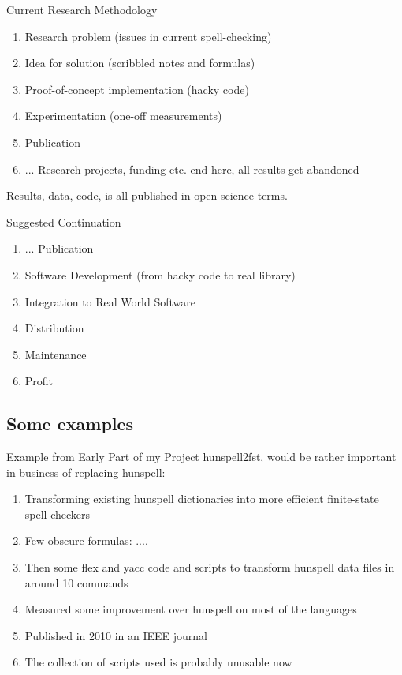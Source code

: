 \documentclass[t,12pt]{beamer}
\begin{document}
\begin{frame}{Current Research Methodology}
    \begin{enumerate}
        \item Research problem (issues in current spell-checking)
        \item Idea for solution (scribbled notes and formulas)
        \item Proof-of-concept implementation (hacky code)
        \item Experimentation (one-off measurements)
        \item Publication
        \item ... Research projects, funding etc. end here, all results get abandoned
    \end{enumerate}
    Results, data, code, is all published in open science terms.
\end{frame}

\begin{frame}{Suggested Continuation}
    \begin{enumerate}
        \item ... Publication 
        \item Software Development (from hacky code to real library)
        \item Integration to Real World Software
        \item Distribution
        \item Maintenance
        \item Profit
    \end{enumerate}
\end{frame}

\subsection{Some examples}

\begin{frame}{Example from Early Part of my Project}
    hunspell2fst, would be rather important in business of replacing hunspell:
    \begin{enumerate}
        \item Transforming existing hunspell dictionaries into more efficient
            finite-state spell-checkers
        \item Few obscure formulas: ....
        \item Then some flex and yacc code and scripts
            to transform hunspell data files in around 10 commands
        \item Measured some improvement over hunspell on most of the languages
        \item Published in 2010 in an IEEE journal
        \item The collection of scripts used is probably unusable now
    \end{enumerate}
\end{frame}
\end{document}
